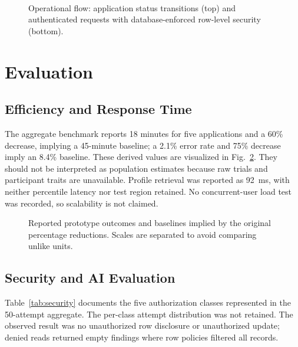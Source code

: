 \documentclass[conference,letterpaper]{IEEEtran}
\begin{document}
\begin{figure}[!t]
\centering
\resizebox{0.94\columnwidth}{!}{}\\[3pt]
\resizebox{0.62\columnwidth}{!}{}
\caption{Operational flow: application status transitions (top) and authenticated requests with database-enforced row-level security (bottom).}
\label{fig:operations}
\end{figure}

\section{Evaluation}
\subsection{Efficiency and Response Time}
The aggregate benchmark reports 18 minutes for five applications and a 60\% decrease, implying a 45-minute baseline; a 2.1\% error rate and 75\% decrease imply an 8.4\% baseline. These derived values are visualized in Fig.~\ref{fig:performance}. They should not be interpreted as population estimates because raw trials and participant traits are unavailable. Profile retrieval was reported as 92~ms, with neither percentile latency nor test region retained. No concurrent-user load test was recorded, so scalability is not claimed.

\begin{figure}[!t]
\centering

\caption{Reported prototype outcomes and baselines implied by the original percentage reductions. Scales are separated to avoid comparing unlike units.}
\label{fig:performance}
\end{figure}

\subsection{Security and AI Evaluation}
Table~\ref{tab:security} documents the five authorization classes represented in the 50-attempt aggregate. The per-class attempt distribution was not retained. The observed result was no unauthorized row disclosure or unauthorized update; denied reads returned empty findings where row policies filtered all records.
\end{document}
